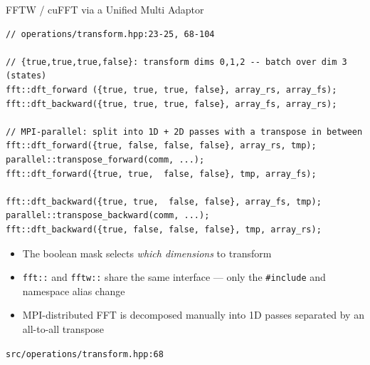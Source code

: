 \documentclass[t,aspectratio=169,handout]{beamer}
\begin{document}
\begin{frame}[fragile,label=inq6,shrink]{FFTW / cuFFT via a Unified Multi Adaptor}
\begin{lstlisting}
// operations/transform.hpp:23-25, 68-104

// {true,true,true,false}: transform dims 0,1,2 -- batch over dim 3 (states)
fft::dft_forward ({true, true, true, false}, array_rs, array_fs);
fft::dft_backward({true, true, true, false}, array_fs, array_rs);

// MPI-parallel: split into 1D + 2D passes with a transpose in between
fft::dft_forward({true, false, false, false}, array_rs, tmp);
parallel::transpose_forward(comm, ...);
fft::dft_forward({true, true,  false, false}, tmp, array_fs);

fft::dft_backward({true, true,  false, false}, array_fs, tmp);
parallel::transpose_backward(comm, ...);
fft::dft_backward({true, false, false, false}, tmp, array_rs);
\end{lstlisting}
\begin{itemize}
  \item The boolean mask selects \textit{which dimensions} to transform
  \item \texttt{fft::} and \texttt{fftw::} share the same interface ---
        only the \texttt{\#include} and namespace alias change
  \item MPI-distributed FFT is decomposed manually into 1D passes
        separated by an all-to-all transpose
\end{itemize}
\tiny\texttt{src/operations/transform.hpp:68}
\end{frame}
\end{document}
